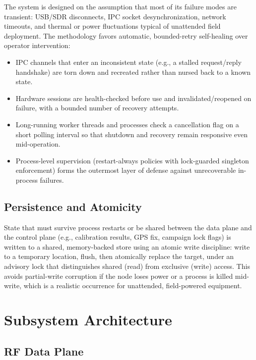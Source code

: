 \documentclass[11pt,a4paper]{article}
\begin{document}
The system is designed on the assumption that most of its failure modes are transient:
USB/SDR disconnects, IPC socket desynchronization, network timeouts, and thermal or power
fluctuations typical of unattended field deployment. The methodology favors automatic,
bounded-retry self-healing over operator intervention:
\begin{itemize}[leftmargin=1.4em]
    \item IPC channels that enter an inconsistent state (e.g., a stalled request/reply
    handshake) are torn down and recreated rather than nursed back to a known state.
    \item Hardware sessions are health-checked before use and invalidated/reopened on
    failure, with a bounded number of recovery attempts.
    \item Long-running worker threads and processes check a cancellation flag on a short
    polling interval so that shutdown and recovery remain responsive even mid-operation.
    \item Process-level supervision (restart-always policies with lock-guarded singleton
    enforcement) forms the outermost layer of defense against unrecoverable in-process
    failures.
\end{itemize}

\subsection{Persistence and Atomicity}

State that must survive process restarts or be shared between the data plane and the control
plane (e.g., calibration results, GPS fix, campaign lock flags) is written to a shared,
memory-backed store using an atomic write discipline: write to a temporary location, flush,
then atomically replace the target, under an advisory lock that distinguishes shared
(read) from exclusive (write) access. This avoids partial-write corruption if the node loses
power or a process is killed mid-write, which is a realistic occurrence for unattended,
field-powered equipment.

\section{Subsystem Architecture}

\subsection{RF Data Plane}
\end{document}

